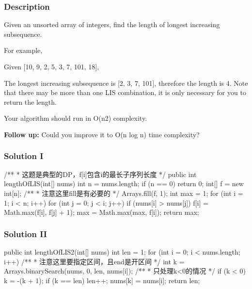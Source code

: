 \subsubsection{Description}
Given an unsorted array of integers, find the length of longest increasing subsequence.

For example,

Given [10, 9, 2, 5, 3, 7, 101, 18],

The longest increasing subsequence is [2, 3, 7, 101], therefore the length is 4. Note that there may be more than one LIS combination, it is only necessary for you to return the length.

Your algorithm should run in O(n2) complexity.

\textbf{Follow up:} Could you improve it to O(n log n) time complexity?

\subsubsection{Solution I}

\begin{Code}
/**
 * 这题是典型的DP，f[i]包含i的最长子序列长度
 */
public int lengthOfLIS(int[] nums) {
    int n = nums.length;
    if (n == 0) {
        return 0;
    }
    int[] f = new int[n];
    /**
     * 注意这里fill是有必要的
     */
    Arrays.fill(f, 1);
    int max = 1;
    for (int i = 1; i < n; i++) {
        for (int j = 0; j < i; j++) {
            if (nums[i] > nums[j]) {
                f[i] = Math.max(f[i], f[j] + 1);
            }
        }
        max = Math.max(max, f[i]);
    }
    return max;
}
\end{Code}

\newpage

\subsubsection{Solution II}
\begin{Code}
public int lengthOfLIS2(int[] nums) {
    int len = 1;
    for (int i = 0; i < nums.length; i++) {
        /**
         * 注意这里要指定区间，且end是开区间
         */
        int k = Arrays.binarySearch(nums, 0, len, nums[i]);
        /**
         * 只处理k<0的情况
         */
        if (k < 0) {
            k = -(k + 1);
            if (k == len) {
                len++;
            }
            nums[k] = nums[i];
        }
    }
    return len;
}
\end{Code}

\newpage

